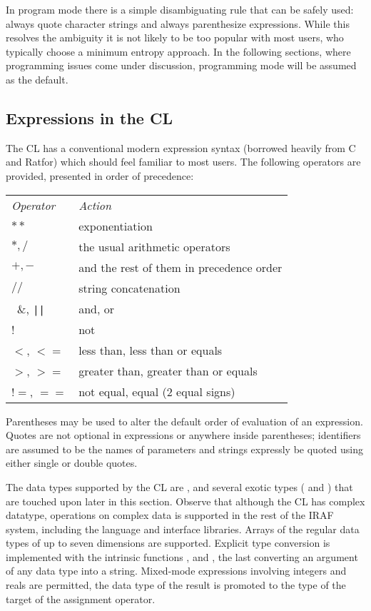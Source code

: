 In program mode there is a simple disambiguating rule that can be safely 
used: always quote character strings and always parenthesize expressions.  
While this resolves the ambiguity it is not likely to be too popular
with most users, who typically choose a minimum entropy approach.
In the following sections, where programming issues come under
discussion, programming mode will be assumed as the default.

\subsection{Expressions in the CL}

The CL has a conventional modern expression syntax (borrowed heavily
from C and Ratfor) which should feel familiar to most
users.  The following operators are provided, presented in order of 
precedence:

\begin{tabular}{ll}
{\it Operator}  &   {\it Action} \\

$**$              &  exponentiation \\
$*, /$    &  the usual arithmetic operators \\
$+, -$	  &  and the rest of them in precedence order \\
$//$              &  string concatenation \\\
\&,  {\tt ||}    &  and, or \\ 
!                 &  not \\
$<$,   $<=$        &  less than, less than or equals \\
$>$,   $>=$        &  greater than, greater than or equals \\
$!=$,   $ ==$        &  not equal, equal (2 equal signs) 

\end{tabular}

\noindent
Parentheses may be used to alter the default order of evaluation of an
expression.  Quotes are not optional in expressions or anywhere inside
parentheses; identifiers are assumed to be the names of parameters and
strings \emphasize{must} expressly be quoted using either single 
or double quotes.

The data types supported by the CL
are , and several exotic types
(\emphasize{imcur, gcur,} and \emphasize{file}) that are touched upon 
later in this section.   Observe that although the CL has 
complex datatype, operations on complex data is supported in the rest
of the IRAF system, including the \irafname{SPP} language and
interface libraries.
Arrays of the regular data types of up to seven dimensions are supported.
Explicit type conversion is implemented with the intrinsic functions
\emphasize{int, real}, and \emphasize{str}, 
the last converting an argument of any data type into a string.
Mixed-mode expressions involving integers and reals are permitted,
the data type of the result is promoted to the type of the target
of the assignment operator.

